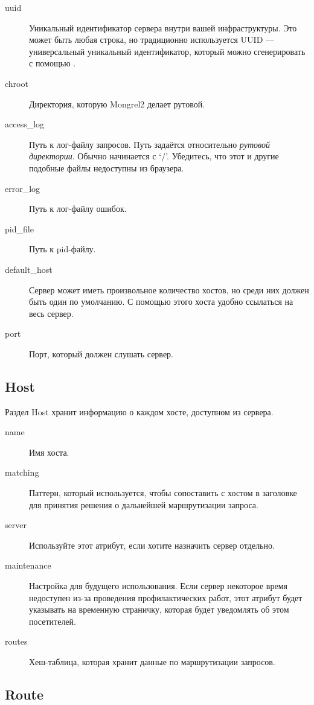 \begin{description}
\item[uuid] Уникальный идентификатор сервера внутри вашей
    инфраструктуры. Это может быть любая строка, но традиционно
    используется UUID --- универсальный уникальный идентификатор, который
    можно сгенерировать с помощью .
\item[chroot] Директория, которую Mongrel2 делает рутовой.
\item[access\_log] Путь к лог-файлу запросов.
    Путь задаётся относительно \emph{рутовой директории}. Обычно
    начинается с `/'. Убедитесь, что этот и другие подобные файлы
    недоступны из браузера.
\item[error\_log] Путь к лог-файлу ошибок.
\item[pid\_file] Путь к pid-файлу.
\item[default\_host] Сервер может иметь произвольное количество
    хостов, но среди них должен быть один по умолчанию. С помощью этого
    хоста удобно ссылаться на весь сервер.
\item[port] Порт, который должен слушать сервер.
\end{description}


\subsection{Host}

Раздел Host хранит информацию о каждом хосте, доступном из сервера.

\begin{description}
\item[name] Имя хоста.
\item[matching] Паттерн, который используется, чтобы сопоставить с
    хостом в заголовке для принятия решения о дальнейшей маршрутизации запроса.
\item[server] Используйте этот атрибут, если хотите назначить сервер отдельно.
\item[maintenance] Настройка для будущего использования. Если сервер
    некоторое время недоступен из-за проведения профилактических работ,
    этот атрибут будет указывать на временную страничку, которая будет
    уведомлять об этом посетителей.
\item[routes] Хеш-таблица, которая хранит данные по маршрутизации запросов.
\end{description}


\subsection{Route}

